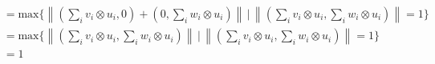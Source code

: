 \begin{equation}
\begin{split}
      &= \text{max} \Bigg\{ \left\lVert \left(\sum_{i} v_i \otimes  u_i ,0  \right) + \left(0,\sum_{i} w_i \otimes u_i  \right)   \right\rVert  \hspace{2pt} \Bigg\vert \hspace{2pt}  \left\lVert \left(\sum_{i} v_i \otimes u_i,\sum_{i} w_i \otimes u_i  \right) \right\rVert =1    \Bigg\} \\
      &= \text{max} \Bigg\{ \left\lVert \left(\sum_{i} v_i \otimes  u_i ,\sum_{i} w_i \otimes u_i   \right)    \right\rVert  \hspace{2pt} \Bigg\vert \hspace{2pt}  \left\lVert \left(\sum_{i} v_i \otimes u_i,\sum_{i} w_i \otimes u_i  \right) \right\rVert =1    \Bigg\} \\
      &=1
  \end{split}
  \end{equation}



